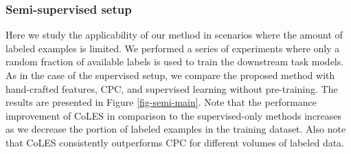 \documentclass[sigconf]{acmart}
\begin{document}
\subsubsection{Semi-supervised setup}

Here we study the applicability of our method in scenarios where the amount of labeled examples
is limited. We performed a series of experiments where only a random fraction of available labels
is used to train the downstream task models. As in the case of the supervised setup, we compare
the proposed method with hand-crafted features, CPC, and supervised learning without pre-training.
% 
The results are presented in Figure \ref{fig-semi-main}. Note that the performance improvement of
CoLES in comparison to the supervised-only methods increases as we decrease the portion of labeled
examples in the training dataset. Also note that CoLES consistently outperforms CPC for different
volumes of labeled data.
\end{document}
